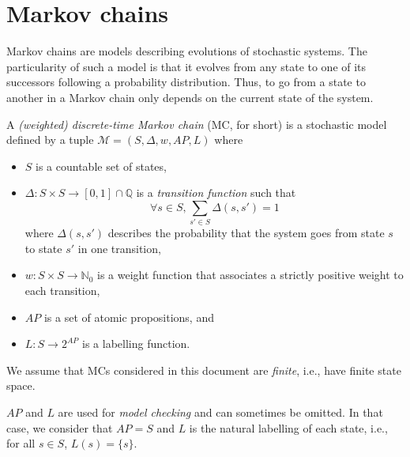 \section{Markov chains}
Markov chains are models describing evolutions of stochastic systems.
The particularity of such a model is that it evolves from any state to one of its successors following a probability distribution.
Thus, to go from a state to another in a Markov chain only depends on the current state of the system.
\begin{definition}
  A \textit{(weighted) discrete-time Markov chain} (MC, for short) is a stochastic model defined by a tuple $\mathcal{M}=(S, \Delta, w, AP, L)$ where
	\begin{itemize}
		\item $S$ is a countable set of states,
		\item $\Delta: S \times S \rightarrow [0,1] \cap \mathbb{Q}$ is a  \textit{transition function} such that \[\forall s \in S, \sum_{s' \in S}\Delta(s, s')= 1\]
		where $\Delta(s, s')$ describes the probability that the system goes from state $s$ to state $s'$ in one transition,
    \item $w: S \times S \rightarrow \mathbb{N}_0$ %
      is a weight function that associates a strictly positive weight to each transition,
    \item $AP$ is a set of atomic propositions, and
    \item $L: S \rightarrow 2^{AP}$ is a labelling function.
	\end{itemize}
\end{definition}

We assume that MCs considered in this document are \textit{finite}, i.e., have finite state space.

\begin{remark}
  $AP$ and $L$ are used for \textit{model checking} and can sometimes be omitted. In that case, we consider that $AP = S$ and $L$ is the natural labelling of each state, i.e., for all $s \in S$, $L(s) = \{s\}$.
\end{remark}

